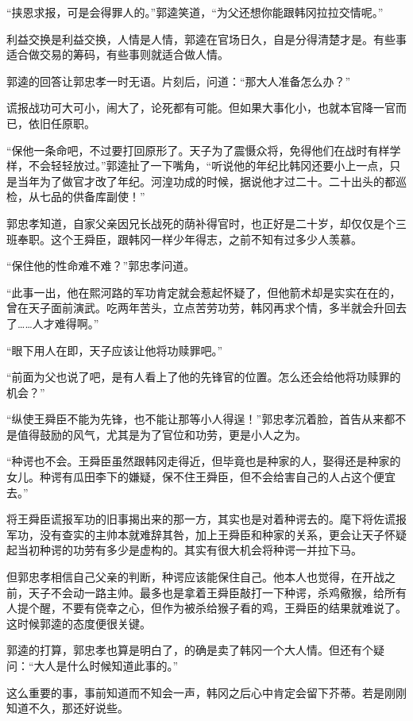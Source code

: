 “挟恩求报，可是会得罪人的。”郭逵笑道，“为父还想你能跟韩冈拉拉交情呢。”

利益交换是利益交换，人情是人情，郭逵在官场日久，自是分得清楚才是。有些事适合做交易的筹码，有些事则就适合做人情。

郭逵的回答让郭忠孝一时无语。片刻后，问道：“那大人准备怎么办？”

谎报战功可大可小，闹大了，论死都有可能。但如果大事化小，也就本官降一官而已，依旧任原职。

“保他一条命吧，不过要打回原形了。天子为了震慑众将，免得他们在战时有样学样，不会轻轻放过。”郭逵扯了一下嘴角，“听说他的年纪比韩冈还要小上一点，只是当年为了做官才改了年纪。河湟功成的时候，据说他才过二十。二十出头的都巡检，从七品的供备库副使！”

郭忠孝知道，自家父亲因兄长战死的荫补得官时，也正好是二十岁，却仅仅是个三班奉职。这个王舜臣，跟韩冈一样少年得志，之前不知有过多少人羡慕。

“保住他的性命难不难？”郭忠孝问道。

“此事一出，他在熙河路的军功肯定就会惹起怀疑了，但他箭术却是实实在在的，曾在天子面前演武。吃两年苦头，立点苦劳功劳，韩冈再求个情，多半就会升回去了……人才难得啊。”

“眼下用人在即，天子应该让他将功赎罪吧。”

“前面为父也说了吧，是有人看上了他的先锋官的位置。怎么还会给他将功赎罪的机会？”

“纵使王舜臣不能为先锋，也不能让那等小人得逞！”郭忠孝沉着脸，首告从来都不是值得鼓励的风气，尤其是为了官位和功劳，更是小人之为。

“种谔也不会。王舜臣虽然跟韩冈走得近，但毕竟也是种家的人，娶得还是种家的女儿。种谔有瓜田李下的嫌疑，保不住王舜臣，但不会给害自己的人占这个便宜去。”

将王舜臣谎报军功的旧事揭出来的那一方，其实也是对着种谔去的。麾下将佐谎报军功，没有查实的主帅本就难辞其咎，加上王舜臣和种家的关系，更会让天子怀疑起当初种谔的功劳有多少是虚构的。其实有很大机会将种谔一并拉下马。

但郭忠孝相信自己父亲的判断，种谔应该能保住自己。他本人也觉得，在开战之前，天子不会动一路主帅。最多也是拿着王舜臣敲打一下种谔，杀鸡儆猴，给所有人提个醒，不要有侥幸之心，但作为被杀给猴子看的鸡，王舜臣的结果就难说了。这时候郭逵的态度便很关键。

郭逵的打算，郭忠孝也算是明白了，的确是卖了韩冈一个大人情。但还有个疑问：“大人是什么时候知道此事的。”

这么重要的事，事前知道而不知会一声，韩冈之后心中肯定会留下芥蒂。若是刚刚知道不久，那还好说些。

